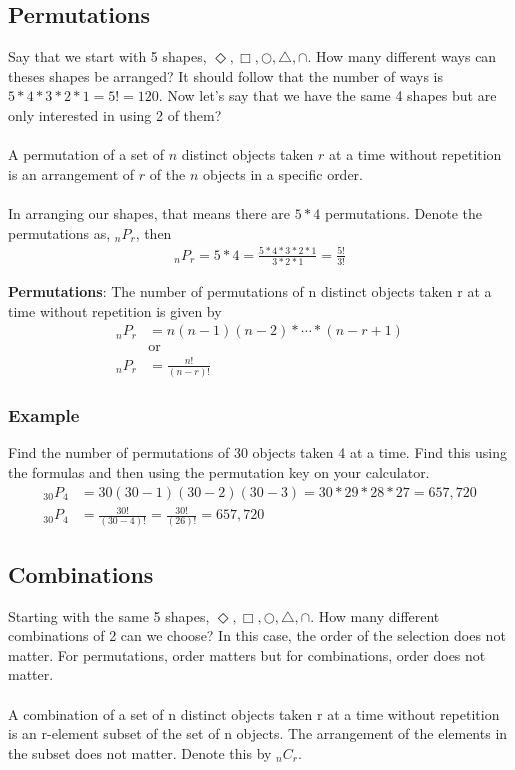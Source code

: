 \documentclass[14pt]{extarticle}
\begin{document}
\subsection{Permutations}
Say that we start with 5 shapes, $\Diamond, \Box, \bigcirc, \bigtriangleup, \cap$. How many different ways can theses shapes be arranged? It should follow that the number of ways is $5*4*3*2*1 = 5! = 120$. Now let's say that we have the same 4 shapes but are only interested in using 2 of them? 
\\\\
A permutation of a set of $n$ distinct objects taken $r$ at a time without repetition is an arrangement of $r$ of the $n$ objects in a specific order.
\\\\
In arranging our shapes, that means there are $5*4$ permutations. Denote the permutations as, $_nP_r$, then
\begin{align*}
	_nP_r = 5*4 = \frac{5*4*3*2*1}{3*2*1} = \frac{5!}{3!}
\end{align*}
\begin{tcolorbox}[enhanced jigsaw,colback=bg,boxrule=0pt,arc=0pt] 
	\textbf{Permutations}: The number of permutations of n distinct objects taken r at a time without repetition is given by
	\begin{align*}
		_nP_r &= n(n-1)(n-2)* \cdots *(n-r+1)\\
		&\text{or} \\
		_nP_r &= \frac{n!}{(n-r)!}
	\end{align*}
\end{tcolorbox}

\subsubsection{Example}
Find the number of permutations of 30 objects taken 4 at a time. Find this using the formulas and then using the permutation key on your calculator.
\begin{align*}
	_{30}P_4 &= 30(30-1)(30-2)(30-3) = 30*29*28*27 = 657,720 \\
	_{30}P_4 &= \frac{30!}{(30-4)!} = \frac{30!}{(26)!} = 657,720
\end{align*}


\subsection{Combinations}
Starting with the same 5 shapes, $\Diamond, \Box, \bigcirc, \bigtriangleup, \cap$. How many different combinations of 2 can we choose? In this case, the order of the selection does not matter. For permutations, order matters but for combinations, order does not matter.
\\\\
A combination of a set of n distinct objects taken r at a time without repetition is an r-element subset of the set of n objects. The arrangement of the elements in the subset does not matter. Denote this by $_{n}C_r$.
\end{document}
